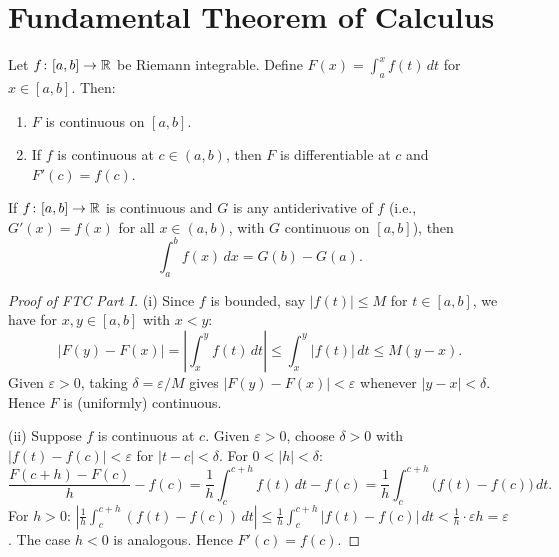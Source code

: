 \documentclass[11pt,a4paper]{article}
\begin{document}
\section{Fundamental Theorem of Calculus}
\label{sec:ftc}

\begin{keyresult}[title={Fundamental Theorem of Calculus}]
\begin{theorem}
\label{thm:ftc1}
Let $f \colon [a, b] \to \mathbb{R}$ be Riemann integrable. Define
$F(x) = \int_a^x f(t)\,dt$ for $x \in [a, b]$. Then:
\begin{enumerate}[nosep,label=(\roman*)]
  \item $F$ is continuous on $[a, b]$.
  \item If $f$ is continuous at $c \in (a, b)$, then $F$ is
    differentiable at $c$ and $F'(c) = f(c)$.
\end{enumerate}
\end{theorem}

\begin{theorem}
\label{thm:ftc2}
If $f \colon [a, b] \to \mathbb{R}$ is continuous and $G$ is any antiderivative
of $f$ (i.e., $G'(x) = f(x)$ for all $x \in (a, b)$, with $G$
continuous on $[a, b]$), then
\[
  \int_a^b f(x)\,dx = G(b) - G(a).
\]
\end{theorem}
\end{keyresult}

\begin{proof}[Proof of FTC Part I]
(i) Since $f$ is bounded, say $|f(t)| \le M$ for $t \in [a, b]$, we
have for $x, y \in [a, b]$ with $x < y$:
\[
  |F(y) - F(x)| = \left|\int_x^y f(t)\,dt\right|
  \le \int_x^y |f(t)|\,dt \le M(y - x).
\]
Given $\varepsilon > 0$, taking $\delta = \varepsilon/M$ gives
$|F(y) - F(x)| < \varepsilon$ whenever $|y - x| < \delta$. Hence $F$
is (uniformly) continuous.

(ii) Suppose $f$ is continuous at $c$. Given $\varepsilon > 0$, choose
$\delta > 0$ with $|f(t) - f(c)| < \varepsilon$ for $|t - c| < \delta$.
For $0 < |h| < \delta$:
\[
  \frac{F(c + h) - F(c)}{h} - f(c)
  = \frac{1}{h}\int_c^{c+h} f(t)\,dt - f(c)
  = \frac{1}{h}\int_c^{c+h} \bigl(f(t) - f(c)\bigr)\,dt.
\]
For $h > 0$:
$\left|\frac{1}{h}\int_c^{c+h}(f(t) - f(c))\,dt\right|
\le \frac{1}{h}\int_c^{c+h}|f(t) - f(c)|\,dt
< \frac{1}{h} \cdot \varepsilon h = \varepsilon$.
The case $h < 0$ is analogous. Hence $F'(c) = f(c)$.
\end{proof}
\end{document}
